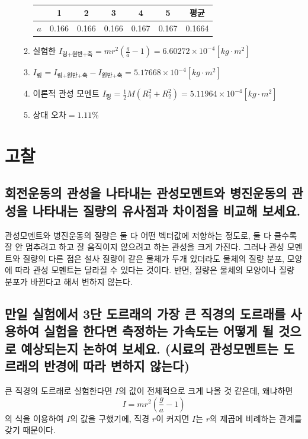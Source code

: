 \documentclass[12pt,a4paper]{article}
\begin{document}
\begin{enumerate}
\begin{enumerate}
                \\
                \begin{tabular}{|c|c|c|c|c|c|c|}
                    \hline
                    &1&2&3&4&5&평균 \\
                    \hline
                    $a$&0.166&0.166&0.166&0.167&0.167&0.1664 \\
                    \hline
                \end{tabular}
            \item 실험한 $I_{\textrm{링+원반+축}}=
                mr^2(\frac{g}{a}-1)=6.60272\times10^{-4}[kg\cdot m^2]$
            \item $I_{\textrm{링}}=I_{\textrm{링+원반+축}}-I_{\textrm{원반+축}}=
                5.17668\times10^{-4}[kg\cdot m^2]$
            \item 이론적 관성 모멘트 $I_{\textrm{링}}=\frac{1}{2}M(R_1^2+R_2^2)=
                5.11964\times10^{-4}[kg\cdot m^2]$
            \item 상대 오차$=1.11\%$
        \end{enumerate}
\end{enumerate}
\clearpage
\section{고찰}
\subsection{회전운동의 관성을 나타내는 관성모멘트와 병진운동의 관성을 나타내는 질량의
    유사점과 차이점을 비교해 보세요.}
    관성모멘트와 병진운동의 질량은 둘 다 어떤 벡터값에 저항하는 정도로, 둘 다 클수록
    잘 안 멈추려고 하고 잘 움직이지 않으려고 하는 관성을 크게 가진다.
    그러나 관성 모멘트와 질량의 다른 점은 설사 질량이 같은 물체가 두개 있더라도
    물체의 질량 분포, 모양에 따라 관성 모멘트는 달라질 수 있다는 것이다.
    반면, 질량은 물체의 모양이나 질량 분포가 바뀐다고 해서 변하지 않는다.
\subsection{만일 실험에서 3단 도르래의 가장 큰 직경의 도르래를 사용하여 실험을
    한다면 측정하는 가속도는 어떻게 될 것으로 예상되는지 논하여 보세요.
    (시료의 관성모멘트는 도르래의 반경에 따라 변하지 않는다)}
    큰 직경의 도르래로 실험한다면 $I$의 값이 전체적으로 크게 나올 것 같은데, 왜냐하면
    $$I=mr^2(\frac{g}{a}-1)$$
    의 식을 이용하여 $I$의 값을 구했기에, 직경 $r$이 커지면 $I$는 $r$의 제곱에
    비례하는 관계를 갖기 때문이다.
\end{document}
